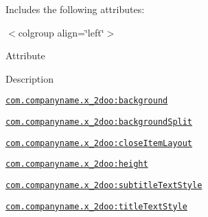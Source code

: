 Includes the following attributes: \begin{TabularC}{0}
\hline
\end{TabularC}
$<$colgroup align=\char`\"{}left\char`\"{}$>$ 

Attribute

Description 

{\tt \hyperlink{classandroid_1_1support_1_1v4_1_1_r_1_1styleable_a9a053b1676fbd1bb2b4db3234f7a47b}{com.companyname.x\_\-2doo:background}}

{\tt \hyperlink{classandroid_1_1support_1_1v4_1_1_r_1_1styleable_8c52d714dfc0ee49d394e2c5f6d4d83c}{com.companyname.x\_\-2doo:backgroundSplit}}

{\tt \hyperlink{classandroid_1_1support_1_1v4_1_1_r_1_1styleable_a4f076d47f79c0b695b050ccd1d9089e}{com.companyname.x\_\-2doo:closeItemLayout}}

{\tt \hyperlink{classandroid_1_1support_1_1v4_1_1_r_1_1styleable_bc09ebbb71fe7090cc37b98f82c34647}{com.companyname.x\_\-2doo:height}}

{\tt \hyperlink{classandroid_1_1support_1_1v4_1_1_r_1_1styleable_8f8b0c324c58b0dcb3f7272911eb5365}{com.companyname.x\_\-2doo:subtitleTextStyle}}

{\tt \hyperlink{classandroid_1_1support_1_1v4_1_1_r_1_1styleable_93a05f44280c1708d5a6f3d307415600}{com.companyname.x\_\-2doo:titleTextStyle}}

